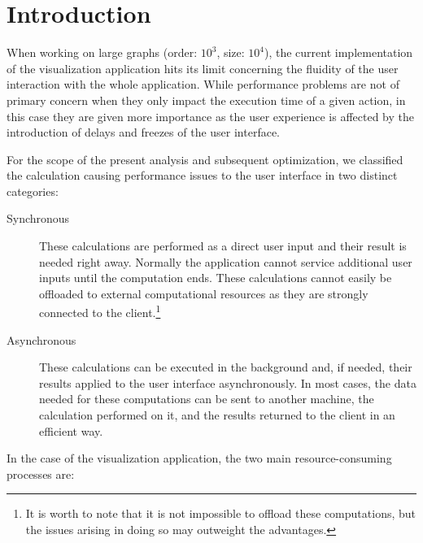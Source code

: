 
\section{Introduction}

When working on large graphs (order: $10^3$, size: $10^4$), the current implementation of the visualization application hits its limit concerning the fluidity of the user interaction with the whole application. While performance problems are not of primary concern when they only impact the execution time of a given action, in this case they are given more importance as the user experience is affected by the introduction of delays and freezes of the user interface.

For the scope of the present analysis and subsequent optimization, we classified the calculation causing performance issues to the user interface in two distinct categories:

\begin{description}
    \item[Synchronous] These calculations are performed as a direct user input and their result is needed right away. Normally the application cannot service additional user inputs until the computation ends. These calculations cannot easily be offloaded to external computational resources as they are strongly connected to the client.\footnote{It is worth to note that it is not impossible to offload these computations, but the issues arising in doing so may outweight the advantages.}
    \item[Asynchronous] These calculations can be executed in the background and, if needed, their results applied to the user interface asynchronously. In most cases, the data needed for these computations can be sent to another machine, the calculation performed on it, and the results returned to the client in an efficient way.
\end{description}

In the case of the visualization application, the two main resource-consuming processes are:

